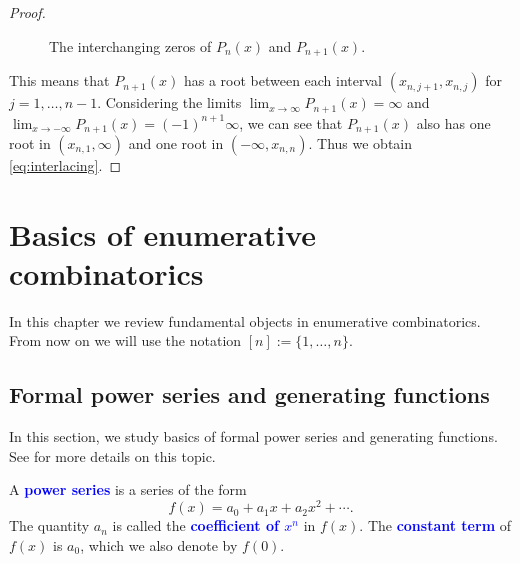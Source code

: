 \documentclass[oneside]{book}
\numberwithin{equation}{section}
\theoremstyle{definition}
\renewcommand\emph[1]{\textcolor{blue}{\bf #1}}
\begin{document}
\begin{proof}
\begin{figure}
  \caption{The interchanging zeros of \( P_n(x) \) and \( P_{n+1}(x) \).}
  \label{fig:image2}
\end{figure}
This means that \( P_{n+1}(x) \) has a root between each interval
\( (x_{n,j+1},x_{n,j}) \) for \( j=1,\dots,n-1 \). Considering the
limits \( \lim_{x\to \infty} P_{n+1}(x) = \infty\) and
\( \lim_{x\to -\infty} P_{n+1}(x) = (-1)^{n+1} \infty\), we can see
that \( P_{n+1}(x) \) also has one root in \( (x_{n,1},\infty) \) and
one root in \( (-\infty,x_{n,n}) \). Thus we obtain
\eqref{eq:interlacing}.
\end{proof}

\chapter{Basics of enumerative combinatorics}
\label{cha:basics-enum-comb}

In this chapter we review fundamental objects in enumerative
combinatorics.
From now on we will use the notation \( [n] := \{ 1,\dots,n\} \).

\section{Formal power series and generating functions}

In this section, we study basics of formal power series and generating
functions. See \cite{Wilf2006} for more details on this topic.

A \emph{power series} is a series of the form
\[
 f(x) = a_0 + a_1 x + a_2 x^2 + \cdots.
\]
The quantity \( a_n \) is called the \emph{coefficient of \( x^n \)}
in \( f(x) \). The \emph{constant term} of \( f(x) \) is \( a_0 \),
which we also denote by \( f(0) \).
\end{document}
